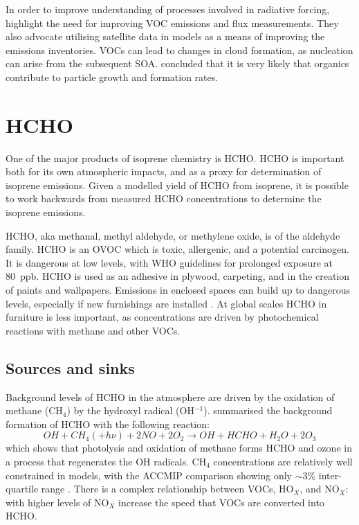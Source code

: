     In order to improve understanding of processes involved in radiative forcing, \textcite{Kanakidou2005} highlight the need for improving VOC emissions and flux measurements.
    They also advocate utilising satellite data in models as a means of improving the emissions inventories.
    VOCs can lead to changes in cloud formation, as nucleation can arise from the subsequent SOA.
    \textcite{Kanakidou2005} concluded that it is very likely that organics contribute to particle growth and formation rates.
    
\section{HCHO}
\label{LR:HCHO}

  One of the major products of isoprene chemistry is HCHO.
  HCHO is important both for its own atmospheric impacts, and as a proxy for determination of isoprene emissions.
  Given a modelled yield of HCHO from isoprene, it is possible to work backwards from measured HCHO concentrations to determine the isoprene emissions.

  HCHO, aka methanal, methyl aldehyde, or methylene oxide, is of the aldehyde family.
  HCHO is an OVOC which is toxic, allergenic, and a potential carcinogen. 
  It is dangerous at low levels, with WHO guidelines for prolonged exposure at 80~ppb.
  HCHO is used as an adhesive in plywood, carpeting, and in the creation of paints and wallpapers.
  Emissions in enclosed spaces can build up to dangerous levels, especially if new furnishings are installed \parencite{Davenport2015}.
  At global scales HCHO in furniture is less important, as concentrations are driven by photochemical reactions with methane and other VOCs.
  
  \subsection{Sources and sinks}
    \label{LR:HCHO:Sources}
     
    Background levels of HCHO in the atmosphere are driven by the oxidation of methane (CH$_4$) by the hydroxyl radical (OH$^{-1}$).
    \textcite{Atkinson2000} summarised the background formation of HCHO with the following reaction:
    \begin{equation*} \label{LR:HCHO:Sources:eqn_MethaneBackground}
      OH + CH_4 (+ h\nu) + 2NO + 2O_2 \rightarrow OH + HCHO + H_2O + 2O_3
    \end{equation*}
    which shows that photolysis and oxidation of methane forms HCHO and ozone in a process that regenerates the OH radicals.
    CH$_4$ concentrations are relatively well constrained in models, with the ACCMIP comparison showing only $\sim3$\% inter-quartile range \parencite{Young2013}.
    There is a complex relationship between VOCs, HO$_X$, and NO$_X$: with higher levels of NO$_X$ increase the speed that VOCs are converted into HCHO\parencite{Wolfe2016}.
    
